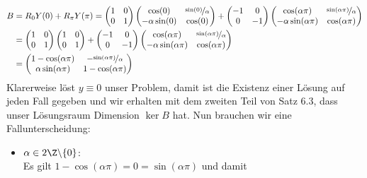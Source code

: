 \begin{solution}
\begin{enumerate}[label = \textbf{\alph*)}]
\begin{align*}
    B &= R_0Y(0) + R_{\pi}Y(\pi) =
    \begin{pmatrix}
      1 & 0 \\ 0 & 1
    \end{pmatrix}
    \begin{pmatrix}
      \cos(0) & \nicefrac{\sin(0)}{\alpha}  \\ -\alpha\sin(0) & \cos(0)
    \end{pmatrix}
    + \begin{pmatrix}
      -1 & 0 \\ 0 & -1
    \end{pmatrix}
    \begin{pmatrix}
      \cos(\alpha \pi) & \nicefrac{\sin(\alpha \pi)}{\alpha}  \\ -\alpha\sin(\alpha \pi) & \cos(\alpha \pi)
    \end{pmatrix} \\
    &= \begin{pmatrix}
      1 & 0 \\ 0 & 1
    \end{pmatrix}
    \begin{pmatrix}
      1 & 0  \\ 0 & 1
    \end{pmatrix}
    + \begin{pmatrix}
      -1 & 0 \\ 0 & -1
    \end{pmatrix}
    \begin{pmatrix}
      \cos(\alpha \pi) & \nicefrac{\sin(\alpha \pi)}{\alpha}  \\ -\alpha\sin(\alpha \pi) & \cos(\alpha \pi)
    \end{pmatrix} \\
    &= \begin{pmatrix}
      1 - \cos(\alpha \pi) & -\nicefrac{\sin(\alpha \pi)}{\alpha} \\
      \alpha\sin(\alpha \pi) & 1 - \cos(\alpha \pi)
    \end{pmatrix}
  \end{align*}
  Klarerweise löst $y \equiv 0$ unser Problem, damit ist die Existenz einer Lösung
  auf jeden Fall gegeben und wir erhalten mit dem zweiten Teil von Satz 6.3, dass
  unser Lösungsraum Dimension $\ker B$ hat.
  Nun brauchen wir eine Fallunterscheidung:
  \begin{itemize}
    \item $\alpha \in 2\Z\backslash\{0\}$: \\
    Es gilt $1 - \cos(\alpha \pi) = 0 = \sin(\alpha \pi)$ und damit

\end{itemize}
\end{enumerate}
\end{solution}
